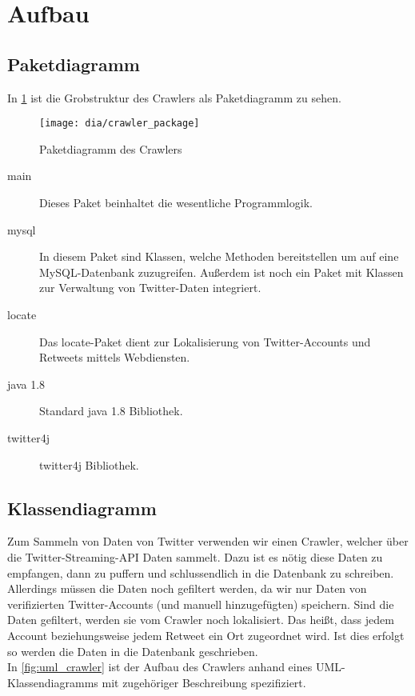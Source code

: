 \section{Aufbau}

\subsection{Paketdiagramm}
In \cref{fig:crawler_package} ist die Grobstruktur des Crawlers als Paketdiagramm zu sehen.
\begin{figure}[h!]
	\centering
	\texttt{[image: dia/crawler\_package]}
	\caption{Paketdiagramm des Crawlers}
	\label{fig:crawler_package}
\end{figure}

\begin{description}
\item[main] Dieses Paket beinhaltet die wesentliche Programmlogik.
\item[mysql] In diesem Paket sind Klassen, welche Methoden bereitstellen um auf eine MySQL-Datenbank zuzugreifen. Außerdem ist noch ein Paket mit Klassen zur Verwaltung von Twitter-Daten integriert.
\item[locate] Das locate-Paket dient zur Lokalisierung von Twitter-Accounts und Retweets mittels Webdiensten.
\item[java 1.8] Standard java 1.8 Bibliothek.
\item[twitter4j] twitter4j Bibliothek.
\end{description}

\subsection{Klassendiagramm}
Zum Sammeln von Daten von Twitter verwenden wir einen Crawler, welcher über die Twitter-Streaming-API Daten sammelt. Dazu ist es nötig diese Daten zu empfangen, dann zu puffern und schlussendlich in die Datenbank zu schreiben. Allerdings müssen die Daten noch gefiltert werden, da wir nur Daten von verifizierten Twitter-Accounts (und manuell hinzugefügten) speichern. Sind die Daten gefiltert, werden sie vom Crawler noch lokalisiert. Das heißt, dass jedem Account beziehungsweise jedem Retweet ein Ort zugeordnet wird. Ist dies erfolgt so werden die Daten in die Datenbank geschrieben.
\\ In \cref{fig:uml_crawler} ist der Aufbau des Crawlers anhand eines UML-Klassendiagramms mit zugehöriger Beschreibung spezifiziert.\\

